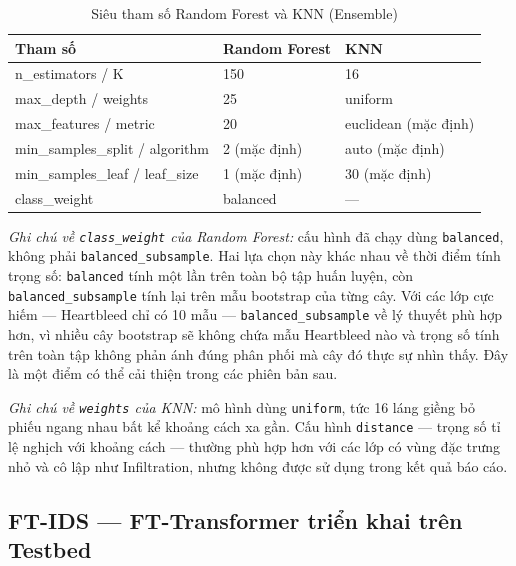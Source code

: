 \documentclass[../DoAn.tex]{subfiles}
\begin{document}
\begin{table}[H]
    \centering
    \caption{Siêu tham số Random Forest và KNN (Ensemble)}
    \label{tab:hyp-rf-knn}
    \begin{tabular}{lll}
        \hline
        \textbf{Tham số} & \textbf{Random Forest} & \textbf{KNN} \\
        \hline
        n\_estimators / K & 150 & 16 \\
        max\_depth / weights & 25 & uniform \\
        max\_features / metric & 20 & euclidean (mặc định) \\
        min\_samples\_split / algorithm & 2 (mặc định) & auto (mặc định) \\
        min\_samples\_leaf / leaf\_size & 1 (mặc định) & 30 (mặc định) \\
        class\_weight & balanced & --- \\
        \hline
    \end{tabular}
\end{table}

\textit{Ghi chú về \texttt{class\_weight} của Random Forest:} cấu hình đã chạy dùng \texttt{balanced}, không phải \texttt{balanced\_subsample}. Hai lựa chọn này khác nhau về thời điểm tính trọng số: \texttt{balanced} tính một lần trên toàn bộ tập huấn luyện, còn \texttt{balanced\_subsample} tính lại trên mẫu bootstrap của từng cây. Với các lớp cực hiếm --- Heartbleed chỉ có 10 mẫu --- \texttt{balanced\_subsample} về lý thuyết phù hợp hơn, vì nhiều cây bootstrap sẽ không chứa mẫu Heartbleed nào và trọng số tính trên toàn tập không phản ánh đúng phân phối mà cây đó thực sự nhìn thấy. Đây là một điểm có thể cải thiện trong các phiên bản sau.

\textit{Ghi chú về \texttt{weights} của KNN:} mô hình dùng \texttt{uniform}, tức 16 láng giềng bỏ phiếu ngang nhau bất kể khoảng cách xa gần. Cấu hình \texttt{distance} --- trọng số tỉ lệ nghịch với khoảng cách --- thường phù hợp hơn với các lớp có vùng đặc trưng nhỏ và cô lập như Infiltration, nhưng không được sử dụng trong kết quả báo cáo.

\subsection{FT-IDS --- FT-Transformer triển khai trên Testbed}
\end{document}
